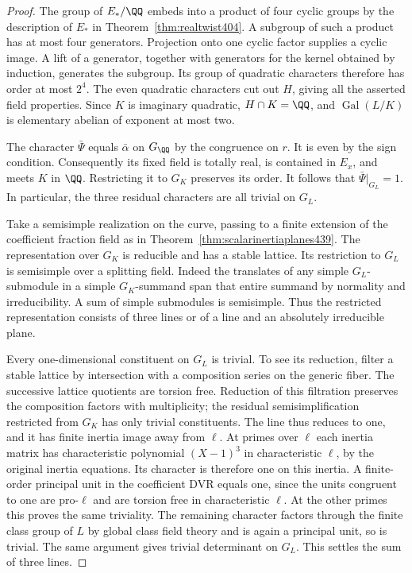 \documentclass[a4paper,11pt]{article}
\theoremstyle{definition}
\theoremstyle{remark}
\numberwithin{equation}{section}
\begin{document}
\begin{proof}
The group of \(E_*/\QQ\) embeds into a product of four cyclic
groups by the description of \(E_*\) in Theorem~\ref{thm:realtwist404}.
A subgroup of such a product has at most four generators.
Projection onto one cyclic factor supplies a cyclic image. A lift
of a generator, together with generators for the kernel obtained
by induction, generates the subgroup. Its group of quadratic
characters therefore has order at most \(2^4\). The even quadratic
characters cut out \(H\), giving all the asserted field properties.
Since \(K\) is imaginary quadratic, \(H\cap K=\QQ\), and
\(\operatorname{Gal}(L/K)\) is elementary abelian of exponent at
most two.

The character \(\bar\Psi\) equals \(\bar\alpha\) on \(G_\QQ\) by
the congruence on \(r\). It is even by the sign condition.
Consequently its fixed field is totally real, is contained in
\(E_x\), and meets \(K\) in \(\QQ\). Restricting it to \(G_K\)
preserves its order. It follows that \(\bar\Psi|_{G_L}=1\).
In particular, the three residual characters are all trivial
on \(G_L\).

Take a semisimple realization on the curve, passing to a finite
extension of the coefficient fraction field as in
Theorem~\ref{thm:scalarinertiaplanes439}. The representation
over \(G_K\) is reducible and has a stable lattice. Its restriction
to \(G_L\) is semisimple over a splitting field. Indeed the
translates of any simple \(G_L\)-submodule in a simple
\(G_K\)-summand span that entire summand by normality and
irreducibility. A sum of simple submodules is semisimple.
Thus the restricted representation consists of three lines or
of a line and an absolutely irreducible plane.

Every one-dimensional constituent on \(G_L\) is trivial. To see
its reduction, filter a stable lattice by intersection with a
composition series on the generic fiber. The successive lattice
quotients are torsion free. Reduction of this filtration preserves
the composition factors with multiplicity; the residual
semisimplification restricted from \(G_K\) has only trivial
constituents. The line thus reduces to one, and it has finite inertia image away from
\(\ell\). At primes over \(\ell\) each inertia matrix has
characteristic polynomial \((X-1)^3\) in characteristic
\(\ell\), by the original inertia equations. Its character is
therefore one on this inertia. A finite-order principal unit in
the coefficient DVR equals one, since the units congruent to one
are pro-\(\ell\) and are torsion free in characteristic \(\ell\).
At the other primes this proves the same triviality. The remaining
character factors through the finite class group of \(L\) by
global class field theory and is again a principal unit, so is
trivial. The same argument gives trivial determinant on \(G_L\).
This settles the sum of three lines.


\end{proof}
\end{document}
